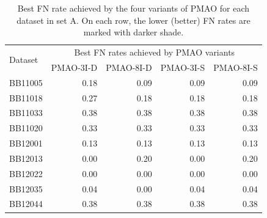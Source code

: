\begin{table}[!htbp]
\begin{adjustwidth}{-0.6cm}{}
	\centering
	\scriptsize
	\caption{Best FN rate achieved by the four variants of PMAO for each dataset in set A. On each row, the lower (better) FN rates are marked with darker shade.}
	\begin{tabular}{|l|r|r|r|r|}
		\hline
		\multirow{2}{*}{Dataset} & \multicolumn{4}{c|}{Best FN rates achieved by PMAO variants} \\
		\cline{2-5}          & PMAO-3I-D & PMAO-8I-D & PMAO-3I-S & PMAO-8I-S \\
		\hline
		BB11005 & \cellcolor[rgb]{ .988,  1,  .992}0.18 & \cellcolor[rgb]{ .384,  .745,  .478}0.09 & \cellcolor[rgb]{ .384,  .745,  .478}0.09 & \cellcolor[rgb]{ .384,  .745,  .478}0.09 \\
		\hline
		BB11018 & \cellcolor[rgb]{ .988,  1,  .992}0.27 & \cellcolor[rgb]{ .384,  .745,  .478}0.18 & \cellcolor[rgb]{ .384,  .745,  .478}0.18 & \cellcolor[rgb]{ .384,  .745,  .478}0.18 \\
		\hline
		BB11033 & \cellcolor[rgb]{ .988,  1,  .992}0.38 & \cellcolor[rgb]{ .988,  1,  .992}0.38 & \cellcolor[rgb]{ .988,  1,  .992}0.38 & \cellcolor[rgb]{ .988,  1,  .992}0.38 \\
		\hline
		BB11020 & \cellcolor[rgb]{ .988,  1,  .992}0.33 & \cellcolor[rgb]{ .988,  1,  .992}0.33 & \cellcolor[rgb]{ .988,  1,  .992}0.33 & \cellcolor[rgb]{ .988,  1,  .992}0.33 \\
		\hline
		BB12001 & \cellcolor[rgb]{ .988,  1,  .992}0.13 & \cellcolor[rgb]{ .988,  1,  .992}0.13 & \cellcolor[rgb]{ .988,  1,  .992}0.13 & \cellcolor[rgb]{ .988,  1,  .992}0.13 \\
		\hline
		BB12013 & \cellcolor[rgb]{ .384,  .745,  .478}0.00 & \cellcolor[rgb]{ .988,  1,  .992}0.20 & \cellcolor[rgb]{ .384,  .745,  .478}0.00 & \cellcolor[rgb]{ .988,  1,  .992}0.20 \\
		\hline
		BB12022 & \cellcolor[rgb]{ .988,  1,  .992}0.00 & \cellcolor[rgb]{ .988,  1,  .992}0.00 & \cellcolor[rgb]{ .988,  1,  .992}0.00 & \cellcolor[rgb]{ .988,  1,  .992}0.00 \\
		\hline
		BB12035 & \cellcolor[rgb]{ .988,  1,  .992}0.04 & \cellcolor[rgb]{ .384,  .745,  .478}0.00 & \cellcolor[rgb]{ .988,  1,  .992}0.04 & \cellcolor[rgb]{ .988,  1,  .992}0.04 \\
		\hline
		BB12044 & \cellcolor[rgb]{ .988,  1,  .992}0.38 & \cellcolor[rgb]{ .988,  1,  .992}0.38 & \cellcolor[rgb]{ .988,  1,  .992}0.38 & \cellcolor[rgb]{ .988,  1,  .992}0.38 \\

\end{tabular}
\end{adjustwidth}
\end{table}
